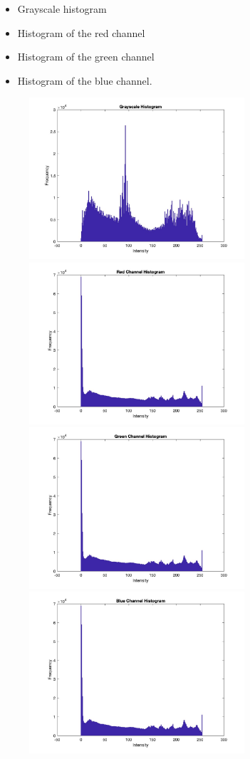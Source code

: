 \documentclass[12pt]{article}
\begin{document}
\begin{itemize}
\item Grayscale histogram
\item Histogram of the red channel
\item Histogram of the green channel
\item Histogram of the blue channel.
\end{itemize}

\begin{figure}[htp]
    \centering
    \includegraphics[width=8cm]{grayscale histogram.jpg}
    \includegraphics[width=8cm]{Red_Channel_Histogram.jpg}
    \includegraphics[width=8cm]{Green_Channel_Histogram.jpg}
    \includegraphics[width=8cm]{Blue_Channel_Histogram.jpg}
\end{figure}
\end{document}
